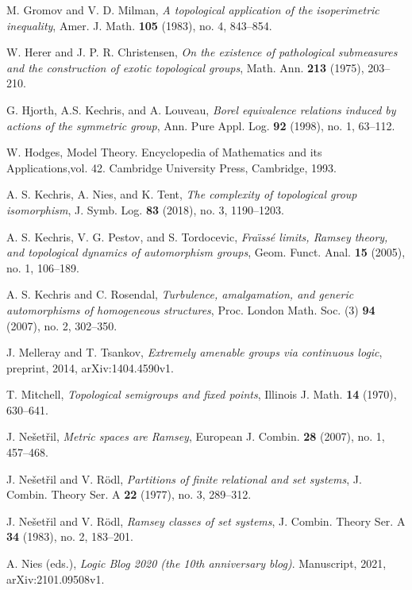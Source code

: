 \documentclass{amsart}
\theoremstyle{definition}
\theoremstyle{remark}
\begin{document}
M. Gromov and V. D. Milman,
\textit{A topological application of the isoperimetric inequality},
Amer. J. Math. {\bf 105} (1983), no. 4, 843--854.

W. Herer and J. P. R. Christensen,
\textit{On the existence of pathological submeasures and the construction of exotic topological groups},
Math. Ann. {\bf 213} (1975), 203--210.

G. Hjorth, A.S. Kechris, and A. Louveau, 
\textit{Borel equivalence relations induced by actions of the symmetric 
group}, Ann. Pure Appl. Log. {\bf 92} (1998), no. 1, 63--112.


W. Hodges, 
Model Theory. Encyclopedia of Mathematics and its Applications,vol. 42.
 Cambridge University Press, Cambridge, 1993.


A. S. Kechris, A. Nies, and K. Tent, 
\textit{The complexity of topological group isomorphism},
J. Symb. Log. {\bf 83} (2018), no. 3, 1190--1203.

A. S. Kechris, V. G. Pestov, and S. Tordocevic,
\textit{Fra\"{\i}ss\'{e} limits, Ramsey theory, and topological dynamics of automorphism groups},
Geom. Funct. Anal. {\bf 15} (2005), no. 1, 106--189.

A. S. Kechris and C. Rosendal,
\textit{Turbulence, amalgamation, and generic automorphisms of homogeneous structures},
Proc. London Math. Soc. (3) {\bf 94} (2007), no. 2, 302--350.

J. Melleray and T. Tsankov,
\textit{Extremely amenable groups via continuous logic},
preprint, 2014,  arXiv:1404.4590v1.

T. Mitchell, 
\textit{Topological semigroups and fixed points},
Illinois J. Math. {\bf 14} (1970), 630--641.


J. Ne\v{s}et\v{r}il,
\textit{Metric spaces are Ramsey},
European J. Combin. {\bf 28} (2007), no. 1, 457--468.

J. Ne\v{s}et\v{r}il and V. R\"{o}dl,
\textit{Partitions of finite relational and set systems},
J. Combin. Theory Ser. A {\bf 22} (1977), no. 3, 289--312.

J. Ne\v{s}et\v{r}il and V. R\"{o}dl,
\textit{Ramsey classes of set systems},
J. Combin. Theory Ser. A {\bf 34} (1983), no. 2, 183--201.

A. Nies (eds.), 
\textit{Logic Blog 2020 (the 10th anniversary blog)}. Manuscript, 2021, arXiv:2101.09508v1.
\end{document}
